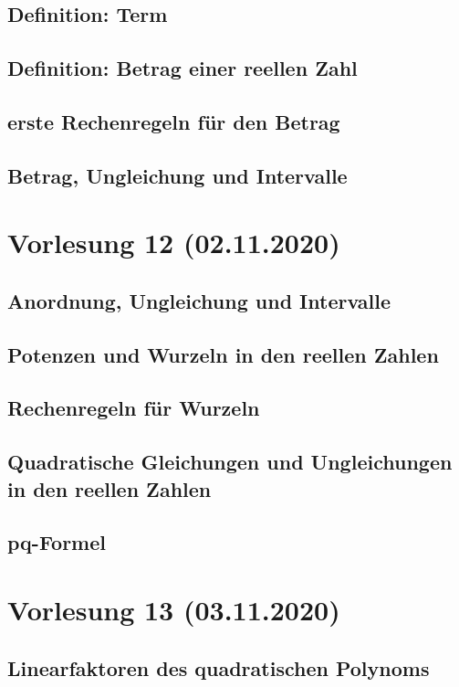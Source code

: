 \documentclass[]{article}
\begin{document}
\subsection{Definition: Term}
\subsection{Definition: Betrag einer reellen Zahl}
\subsection{erste Rechenregeln für den Betrag}
\subsection{Betrag, Ungleichung und Intervalle}


\section{Vorlesung 12 (02.11.2020)}
\subsection{Anordnung, Ungleichung und Intervalle}
\subsection{Potenzen und Wurzeln in den reellen Zahlen}
\subsection{Rechenregeln für Wurzeln}
\subsection{Quadratische Gleichungen und Ungleichungen in den reellen Zahlen}
\subsection{pq-Formel}


\section{Vorlesung 13 (03.11.2020)}
\subsection{Linearfaktoren des quadratischen Polynoms}
\end{document}
